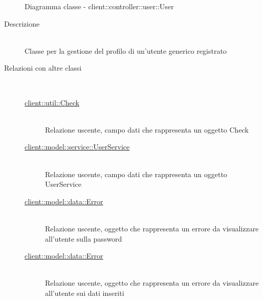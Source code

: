 \begin{figure}[H]
\begin{tikzpicture}
	\end{tikzpicture}
	\caption{Diagramma classe - client::controller::user::User}
\end{figure}\begin{description}
\item[Descrizione] \hfill \\
Classe per la gestione del profilo di un'utente generico registrato
\item[Relazioni con altre classi] \hfill \\
\vspace{-7mm}
\begin{description}
	\item[\hyperlink{client::util::Check}{client::util::Check}] \hfill \\
	Relazione uscente, campo dati che rappresenta un oggetto Check
	\item[\hyperlink{client::model::service::UserService}{client::model::service::UserService}] \hfill \\
	Relazione uscente, campo dati che rappresenta un oggetto UserService
	\item[\hyperlink{client::model::data::Error}{client::model::data::Error}] \hfill \\
	Relazione uscente, oggetto che rappresenta un errore da visualizzare all'utente sulla password
	\item[\hyperlink{client::model::data::Error}{client::model::data::Error}] \hfill \\
	Relazione uscente, oggetto che rappresenta un errore da visualizzare all'utente sui dati inseriti
\end{description}


\end{description}
